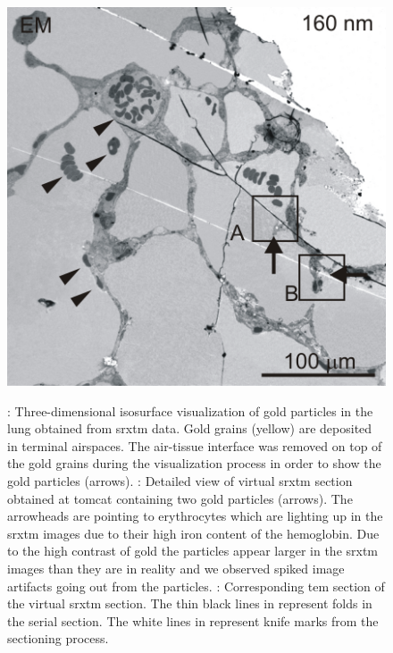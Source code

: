 \begin{figure}
{		\includegraphics[height=\imsize]{img/XRM2008/em/au900-1b-b}%
		\label{subfig:slice-em}%
		}%
	\caption[Three-dimensional isosurface visualization of gold particles in the lung obtained from SRXTM data]{: Three-dimensional isosurface visualization of gold particles in the lung obtained from \ac{srxtm} data. Gold grains (yellow) are deposited in terminal airspaces. The air-tissue interface was removed on top of the gold grains during the visualization process in order to show the gold particles (arrows). : Detailed view of virtual \ac{srxtm} section obtained at \ac{tomcat} containing two gold particles (arrows). The arrowheads are pointing to erythrocytes which are lighting up in the \ac{srxtm} images due to their high iron content of the hemoglobin. Due to the high contrast of gold the particles appear larger in the \ac{srxtm} images than they are in reality and we observed spiked image artifacts going out from the particles. : Corresponding \ac{tem} section of the virtual \ac{srxtm} section. The thin black lines in  represent folds in the serial section. The white lines in  represent knife marks from the sectioning process.}%
	\label{fig:imaris}%
\end{figure}

